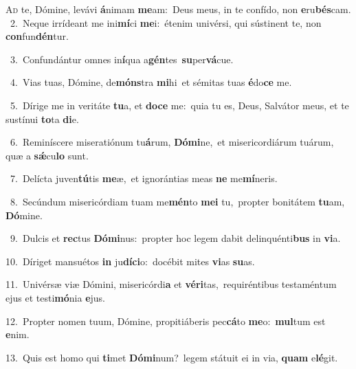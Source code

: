 \lettrine{\initial\textcolor{\initialcolor}{A}}{d} te, Dómine, levávi \textbf{á}\-nimam \textbf{me}\-am:~\star Deus meus, in te confído, non \textbf{e}\-ru\-\textbf{bés}\-cam.\\
{\numbfont\textcolor{\numbcolor}{~2.}}~Neque irrídeant me ini\-\textbf{mí}\-ci \textbf{me}\-i:~\star étenim univérsi, qui sústinent te, non \textbf{con}\-fun\-\textbf{dén}\-tur.\par
{\numbfont\textcolor{\numbcolor}{~3.}}~Confundántur omnes in\-\textbf{í}\-qua a\-\textbf{gén}\-tes~\star \textbf{su}\-per\-\textbf{vá}\-cue.\par
{\numbfont\textcolor{\numbcolor}{~4.}}~Vias tuas, Dómine, de\-\textbf{móns}\-tra \textbf{mi}\-hi~\star et sémitas tuas \textbf{é}\-do\textbf{ce} me.\par
{\numbfont\textcolor{\numbcolor}{~5.}}~Dírige me in veritáte \textbf{tu}\-a, et \textbf{do}\-\textbf{ce} me:~\star quia tu es, Deus, Salvátor meus, et te sustínui \textbf{to}\-ta \textbf{di}\-e.\par
{\numbfont\textcolor{\numbcolor}{~6.}}~Reminíscere miseratiónum tu\-\textbf{á}\-rum, \textbf{Dó}\-\textbf{mi}ne,~\star et misericordiárum tuárum, quæ a \textbf{sǽ}\-cu\textbf{lo} sunt.\par
{\numbfont\textcolor{\numbcolor}{~7.}}~Delícta juven\-\textbf{tú}\-tis \textbf{me}\-æ,~\star et ignorántias meas \textbf{ne} me\-\textbf{mí}\-neris.\par
{\numbfont\textcolor{\numbcolor}{~8.}}~Secúndum misericórdiam tuam me\-\textbf{mén}\-to \textbf{me}\-\textbf{i} tu,~\star propter bonitátem \textbf{tu}\-am, \textbf{Dó}\-mine.\par
{\numbfont\textcolor{\numbcolor}{~9.}}~Dulcis et \textbf{rec}\-tus \textbf{Dó}\-\textbf{mi}nus:~\star propter hoc legem dabit delinquénti\textbf{bus} in \textbf{vi}\-a.\par
{\numbfont\textcolor{\numbcolor}{10.}}~Díriget mansuétos \textbf{in} ju\-\textbf{dí}\-\textbf{ci}o:~\star docébit mites \textbf{vi}\-as \textbf{su}\-as.\par
{\numbfont\textcolor{\numbcolor}{11.}}~Univérsæ viæ Dómini, misericórdi\textbf{a} et \textbf{vé}\-\textbf{ri}tas,~\star requiréntibus testaméntum ejus et testi\-\textbf{mó}\-nia \textbf{e}\-jus.\par
{\numbfont\textcolor{\numbcolor}{12.}}~Propter nomen tuum, Dómine, propitiáberis pec\-\textbf{cá}\-to \textbf{me}\-o:~\star \textbf{mul}\-tum est \textbf{e}\-nim.\par
{\numbfont\textcolor{\numbcolor}{13.}}~Quis est homo qui \textbf{ti}\-met \textbf{Dó}\-\textbf{mi}num?~\star legem státuit ei in via, \textbf{quam} e\-\textbf{lé}\-git.\par
